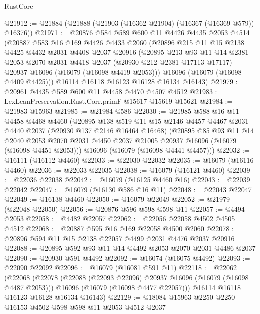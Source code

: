 \begin{lexlean}{RustCore}
\begin{coremodule}
@21912 := @21884 (@21888 (@21903 (@16362 @21904) (@16367 (@16369 @579)) @16376))
@21971 := @20876
    @584
    @589
    @600
    @11
    @4426
    @4435
    @2053
    @4514
    (@20887
      @583
      @16
      @169
      @4426
      @4433
      @2060
      (@20896
        @215
        @11
        @15
        @2138
        @4425
        @4432
        @2031
        @4408
        @2037
        @20916
        (@20895
          @213
          @93
          @11
          @14
          @2381
          @2053
          @2070
          @2031
          @4418
          @2037
          (@20930 @212 @2381 @17113 @17117)
          @20937
          @16096
          (@16079 (@16098 @4419 @2053)))
        @16096
        (@16079 (@16098 @4409 @4425)))
      @16114
      @16118
      @16123
      @16128
      @16134
      @16143)
@21979 := @20961 @4435 @589 @600 @11 @4458 @4470 @4507 @4512
@21983 := LexLeanPreservation.Rust.Corr.primF @15617 @15619 @15621
@21984 := @21983 @15963
@21985 := @21984 @586
@22030 := @21985
    @588
    @16
    @11
    @4458
    @4468
    @4460
    (@20895
      @138
      @519
      @11
      @15
      @2146
      @4457
      @4467
      @2031
      @4440
      @2037
      (@20930 @137 @2146 @16464 @16468)
      (@20895
        @85
        @93
        @11
        @14
        @2040
        @2053
        @2070
        @2031
        @4450
        @2037
        @21005
        @20937
        @16096
        (@16079 (@16098 @4451 @2053)))
      @16096
      (@16079 (@16098 @4441 @4457)))
@22032 := @16111 (@16112 @4460)
@22033 := @22030 @22032
@22035 := @16079 (@16116 @4460)
@22036 := @22033 @22035
@22038 := @16079 (@16121 @4460)
@22039 := @22036 @22038
@22042 := @16079 (@16125 @4460 @16)
@22043 := @22039 @22042
@22047 := @16079 (@16130 @586 @16 @11)
@22048 := @22043 @22047
@22049 := @16138 @4460
@22050 := @16079 @22049
@22052 := @21979 (@22048 @22050)
@22056 := @20876 @596 @598 @598 @11
@22057 := @4494 @2053
@22058 := @4482 @22057
@22062 := @22056 @22058 @4502 @4505 @4512
@22068 := @20887 @595 @16 @169 @22058 @4500 @2060
@22078 := @20896 @594 @11 @15 @2138 @22057 @4499 @2031 @4476 @2037 @20916
@22088 := @20895 @592 @93 @11 @14 @4492 @2053 @2070 @2031 @4486 @2037
@22090 := @20930 @591 @4492
@22092 := @16074 (@16075 @4492)
@22093 := @22090 @22092
@22096 := @16079 (@16081 @591 @11)
@22118 := @22062
    (@22068
      (@22078
        (@22088 (@22093 @22096) @20937 @16096 (@16079 (@16098 @4487 @2053)))
        @16096
        (@16079 (@16098 @4477 @22057)))
      @16114
      @16118
      @16123
      @16128
      @16134
      @16143)
@22129 := @18084 @15963 @2250 @2250 @16153 @4502 @598 @598 @11 @2053 @4512 @2037

\end{coremodule}
\end{lexlean}
